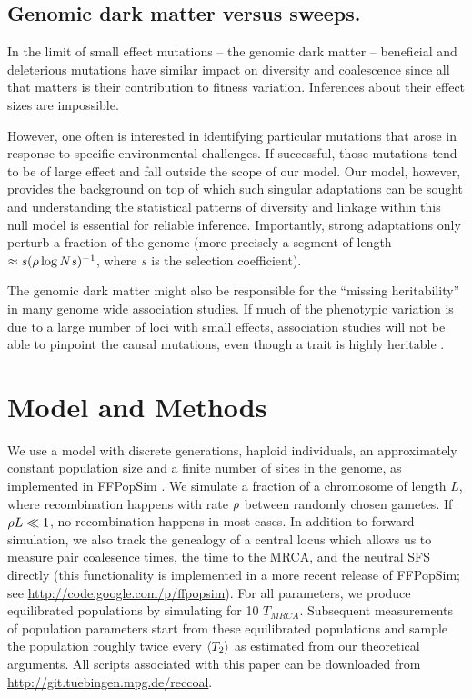 \subsection*{Genomic dark matter versus sweeps.}
In the limit of small effect mutations -- the genomic dark matter --
beneficial and deleterious mutations have similar impact on diversity
and coalescence since all that matters is their contribution to fitness
variation. Inferences about their effect sizes are impossible.

However, one often is interested in identifying particular mutations
that arose in response to specific environmental challenges. If
successful, those mutations tend to be of large effect and fall outside
the scope of our model. Our model, however, provides the background on
top of which such singular adaptations can be sought and understanding
the statistical patterns of diversity and linkage within this null model
is essential for reliable inference. Importantly, strong 
adaptations only perturb a fraction of the genome (more precisely a
segment of length $\approx s(\rho \log Ns)^{-1}$, where $s$ is the
selection coefficient). 

The genomic dark matter might also be responsible for the ``missing
heritability'' in many genome wide association studies. If much of the
phenotypic variation is due to a large number of loci with small
effects, association studies will not be able to pinpoint the causal
mutations, even though a trait is highly heritable \cite{Yang:2010p35988}.

\section{Model and Methods}
We use a model with discrete generations, haploid individuals, an approximately constant
population size and a finite number of sites in the genome, as
implemented in FFPopSim \cite{zanini_ffpopsim:_2012}. We simulate a
fraction of a chromosome of length $L$, where recombination happens with
rate $\rho$ between randomly chosen gametes. If $\rho L\ll 1$, no
recombination happens in most cases. In addition to forward simulation,
we also track the genealogy of a central locus which allows us to measure pair
coalesence times, the time to the MRCA, and the neutral SFS directly
(this functionality is implemented in a more recent release of FFPopSim;
see \url{http://code.google.com/p/ffpopsim}). For all parameters, we
produce equilibrated populations by simulating for 10
$T_{MRCA}$. Subsequent measurements of population parameters start from
these equilibrated populations and sample the population roughly twice
every $\langle T_2\rangle$ as estimated from our theoretical arguments. All scripts
associated with this paper can be downloaded from
\url{http://git.tuebingen.mpg.de/reccoal}.

